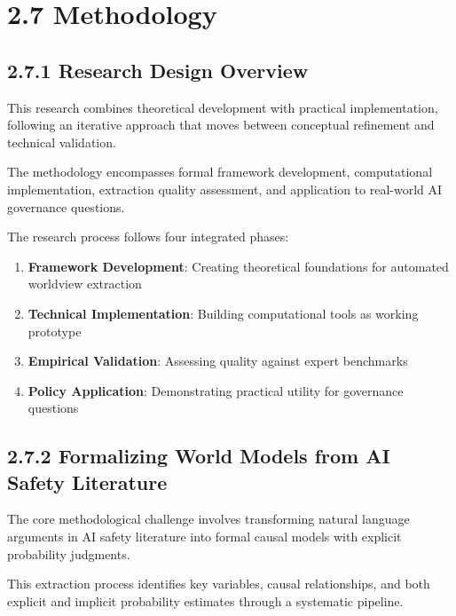 \documentclass[
  11pt,
  letterpaper,
]{book}
\providecommand{\tightlist}{%
  \setlength{\itemsep}{0pt}\setlength{\parskip}{0pt}}
\begin{document}
\section*{2.7 Methodology}\label{sec-methodology}


\subsection*{2.7.1 Research Design Overview}\label{sec-research-design}

This research combines theoretical development with practical
implementation, following an iterative approach that moves between
conceptual refinement and technical validation.

The methodology encompasses formal framework development, computational
implementation, extraction quality assessment, and application to
real-world AI governance questions.

The research process follows four integrated phases:

\begin{enumerate}
\def\labelenumi{\arabic{enumi}.}
\tightlist
\item
  \textbf{Framework Development}: Creating theoretical foundations for
  automated worldview extraction
\item
  \textbf{Technical Implementation}: Building computational tools as
  working prototype
\item
  \textbf{Empirical Validation}: Assessing quality against expert
  benchmarks
\item
  \textbf{Policy Application}: Demonstrating practical utility for
  governance questions
\end{enumerate}

\subsection*{2.7.2 Formalizing World Models from AI Safety
Literature}\label{sec-formalizing-world-models}

The core methodological challenge involves transforming natural language
arguments in AI safety literature into formal causal models with
explicit probability judgments.

This extraction process identifies key variables, causal relationships,
and both explicit and implicit probability estimates through a
systematic pipeline.
\end{document}
